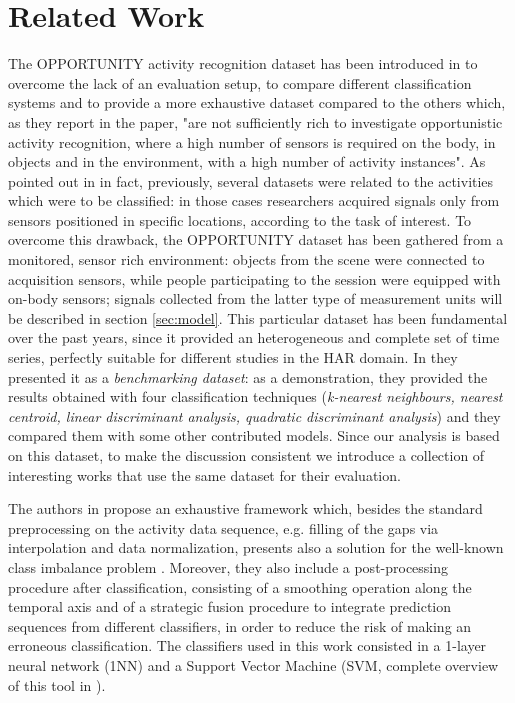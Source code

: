 
\section{Related Work}
\label{sec:related_work}
The OPPORTUNITY activity recognition dataset has been introduced in \cite{ComplexAct-2010} to overcome the lack of an evaluation setup, to compare different classification systems and to provide a more exhaustive dataset compared to the others which, as they report in the paper, "are not sufficiently rich to investigate opportunistic activity recognition, where a high number of sensors is required on the body, in objects and in the environment, with a high number of activity instances". As pointed out in \cite{Chavarriaga2013} in fact, previously, several datasets were related to the activities which were to be classified: in those cases researchers acquired signals only from sensors positioned in specific locations, according to the task of interest.
To overcome this drawback, the OPPORTUNITY dataset has been gathered from a monitored, sensor rich environment: objects from the scene were connected to acquisition sensors, while people participating to the session were equipped with on-body sensors; signals collected from the latter type of measurement units will be described in section \ref{sec:model}. This particular dataset has been fundamental over the past years, since it provided an heterogeneous and complete set of time series, perfectly suitable for different studies in the HAR domain. In \cite{Chavarriaga2013} they presented it as a \textit{benchmarking dataset}: as a demonstration, they provided the results obtained with four classification techniques (\textit{k-nearest neighbours, nearest centroid, linear discriminant analysis, quadratic discriminant analysis}) and they compared them with some other contributed models. Since our analysis is based on this dataset, to make the discussion consistent we introduce a collection of interesting works that use the same dataset for their evaluation.

The authors in \cite{cao2012integrated} propose an exhaustive framework which, besides the standard preprocessing on the activity data sequence, e.g. filling of the gaps via interpolation and data normalization, presents also a solution for the well-known class imbalance problem \cite{japkowicz2002class}. Moreover, they also include a post-processing procedure after classification, consisting of a smoothing operation along the temporal axis and of a strategic fusion procedure to integrate prediction sequences from different classifiers, in order to reduce the risk of making an erroneous classification. The classifiers used in this work consisted in a 1-layer neural network (1NN) and a Support Vector Machine (SVM, complete overview of this tool in \cite{hearst1998support}). 

